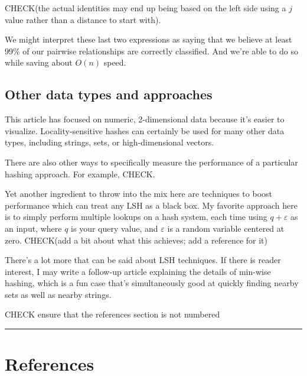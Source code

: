 \documentclass[20pt,]{extarticle}
\begin{document}
CHECK(the actual identities may end up being based on the left side
using a \(j\) value rather than a distance to start with).

We might interpret these last two expressions as saying that we believe
at least 99\% of our pairwise relationships are correctly classified.
And we're able to do so while saving about \(O(n)\) speed.

\subsection{Other data types and
approaches}\label{other-data-types-and-approaches}

This article has focused on numeric, 2-dimensional data because it's
easier to visualize. Locality-sensitive hashes can certainly be used for
many other data types, including strings, sets, or high-dimensional
vectors.

There are also other ways to specifically measure the performance of a
particular hashing approach. For example, CHECK.

Yet another ingredient to throw into the mix here are techniques to
boost performance which can treat any LSH as a black box. My favorite
approach here is to simply perform multiple lookups on a hash system,
each time using \(q + \varepsilon\) as an input, where \(q\) is your
query value, and \(\varepsilon\) is a random variable centered at zero.
CHECK(add a bit about what this achieves; add a reference for it)

There's a lot more that can be said about LSH techniques. If there is
reader interest, I may write a follow-up article explaining the details
of min-wise hashing, which is a fun case that's simultaneously good at
quickly finding nearby sets as well as nearby strings.

CHECK ensure that the references section is not numbered

\begin{center}\rule{0.5\linewidth}{\linethickness}\end{center}

\section{References}\label{references}
\end{document}
